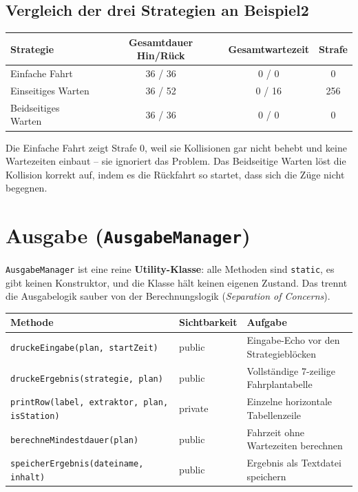 \documentclass[12pt,a4paper]{article}
\begin{document}
\subsection{Vergleich der drei Strategien an Beispiel2}

\begin{center}
\begin{tabular}{lccc}
\toprule
\textbf{Strategie} & \textbf{Gesamtdauer Hin/Rück} & \textbf{Gesamtwartezeit} & \textbf{Strafe} \\
\midrule
Einfache Fahrt & 36 / 36 & 0 / 0 & 0 \\
Einseitiges Warten & 36 / 52 & 0 / 16 & 256 \\
Beidseitiges Warten & 36 / 36 & 0 / 0 & 0 \\
\bottomrule
\end{tabular}
\end{center}

\begin{hinweisbox}
Die Einfache Fahrt zeigt Strafe 0, weil sie Kollisionen gar nicht behebt und keine Wartezeiten einbaut -- sie ignoriert das Problem. Das Beidseitige Warten löst die Kollision korrekt auf, indem es die Rückfahrt so startet, dass sich die Züge nicht begegnen.
\end{hinweisbox}

\section{Ausgabe (\texttt{AusgabeManager})}
\label{sec:ausgabe}

\texttt{AusgabeManager} ist eine reine \textbf{Utility-Klasse}: alle Methoden sind
\texttt{static}, es gibt keinen Konstruktor, und die Klasse hält keinen eigenen Zustand.
Das trennt die Ausgabelogik sauber von der Berechnungslogik
(\emph{Separation of Concerns}).

\begin{center}
\begin{tabular}{lll}
\toprule
\textbf{Methode} & \textbf{Sichtbarkeit} & \textbf{Aufgabe} \\
\midrule
\texttt{druckeEingabe(plan, startZeit)}            & public  & Eingabe-Echo vor den Strategieblöcken \\
\texttt{druckeErgebnis(strategie, plan)}            & public  & Vollständige 7-zeilige Fahrplantabelle \\
\texttt{printRow(label, extraktor, plan, isStation)}& private & Einzelne horizontale Tabellenzeile \\
\texttt{berechneMindestdauer(plan)}                 & public  & Fahrzeit ohne Wartezeiten berechnen \\
\texttt{speicherErgebnis(dateiname, inhalt)}        & public  & Ergebnis als Textdatei speichern \\
\bottomrule
\end{tabular}
\end{center}
\end{document}
